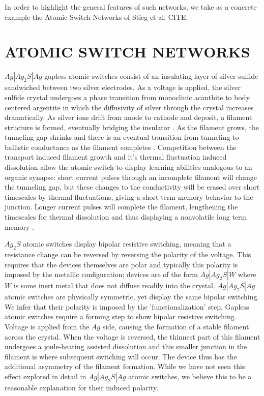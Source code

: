 \documentclass[aps,prl,preprint,groupedaddress]{revtex4-1}
\begin{document}
In order to highlight the general features of such networks, we take as
a concrete example the Atomic Switch Networks of Stieg et al. CITE.


\section{ATOMIC SWITCH NETWORKS}

$Ag | Ag_2 S | Ag$ gapless atomic switches consist of an insulating layer
of silver sulfide sandwiched between two silver electrodes.  As a voltage is
applied, the silver sulfide crystal undergoes a phase transition from
monoclinic acanthite to body centered argentite in which the diffusivity of
silver through the crystal increases dramatically.  As silver ions drift
from anode to cathode and deposit, a filament structure is formed, eventually
bridging the insulator \cite{Xu2010}. As the filament grows, the
tunneling gap shrinks and there is an eventual transition from tunneling
to ballistic conductance as the filament completes
\cite{Hasegawa2010, Sun2014}. Competition between the transport induced
filament growth and it's thermal fluctuation induced dissolution allow the
atomic switch to display learning abilities analogous to an organic synapse:
short current pulses through an incomplete filament will change the tunneling
gap, but these changes to the conductivity will be erased over short timescales
by thermal fluctuations, giving a short term memory behavior to the junction.
Longer current pulses will complete the filament, lengthening the timescales
for thermal dissolution and thus displaying a nonvolatile long term memory
\cite{Hasegawa2010, Ohno2011}.

$Ag_2 S$ atomic switches display bipolar resistive switching, meaning that
a resistance change can be reversed by reversing the polarity of the voltage.
This requires that the devices themselves are polar and typically this
polarity is imposed by the metallic configuration; devices are of the form
$Ag|Ag_2 S|W$ where $W$ is some inert metal that does not diffuse readily into
the crystal.  $Ag|Ag_2 S| Ag$ atomic switches are physically symmetric, yet
display the same bipolar switching.  We infer that their polarity is imposed
by the
'functionalization' step.  Gapless atomic switches require a forming step
to show bipolar resistive switching.  Voltage is applied from the $Ag$ side,
causing the formation of a stable filament across the crystal.  When the
voltage is reversed, the thinnest part of this filament undergoes a 
joule-heating assisted dissolution \cite{Hasegawa2012} and this smaller
junction in the filament is where subsequent switching will occur.  The device
thus has the additional asymmetry of the filament formation.  While we have
not seen this effect explored in detail in $Ag|Ag_2 S |Ag$ atomic switches,
we believe this to be a reasonable explanation for their induced polarity.
\end{document}
